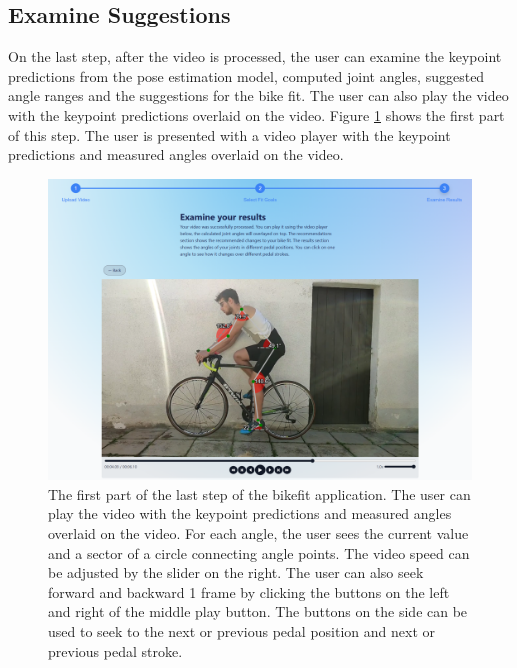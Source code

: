 \subsection{Examine Suggestions} On the last step, after the video is processed, the user can examine the keypoint predictions from the pose estimation model, computed joint angles, suggested angle ranges and the suggestions for the bike fit. The user can also play the video with the keypoint predictions overlaid on the video. Figure \ref{fig:step3-top} shows the first part of this step. The user is presented with a video player with the keypoint predictions and measured angles overlaid on the video.


\begin{figure}[htbp]
    \centering
    \includegraphics[width=\textwidth]{obrazky-figures/step3-top-crop.png}
    \caption{The first part of the last step of the bikefit application. The user can play the video with the keypoint predictions and measured angles overlaid on the video. For each angle, the user sees the current value and a sector of a circle connecting angle points. The video speed can be adjusted by the slider on the right. The user can also seek forward and backward 1 frame by clicking the buttons on the left and right of the middle play button. The buttons on the side can be used to seek to the next or previous pedal position and next or previous pedal stroke.}
    \label{fig:step3-top}
\end{figure}

